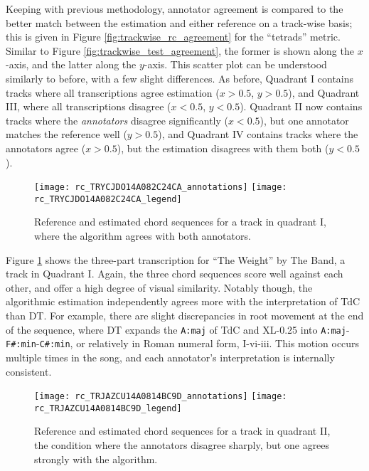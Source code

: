 Keeping with previous methodology, annotator agreement is compared to the better match between the estimation and either reference on a track-wise basis; this is given in Figure \ref{fig:trackwise_rc_agreement} for the ``tetrads'' metric.
Similar to Figure \ref{fig:trackwise_test_agreement}, the former is shown along the $x$-axis, and the latter along the $y$-axis.
This scatter plot can be understood similarly to before, with a few slight differences.
As before, Quadrant I contains tracks where all transcriptions agree estimation ($x > 0.5$, $y > 0.5$), and Quadrant III, where all transcriptions disagree ($x < 0.5$, $y < 0.5$).
Quadrant II now contains tracks where the \emph{annotators} disagree significantly ($x < 0.5$), but one annotator matches the reference well ($y > 0.5$), and Quadrant IV contains tracks where the annotators agree ($x > 0.5$), but the estimation disagrees with them both ($y < 0.5$).


\begin{figure}[t!]
\centering
\texttt{[image: rc\_TRYCJDO14A082C24CA\_annotations]}
\texttt{[image: rc\_TRYCJDO14A082C24CA\_legend]}
\caption{Reference and estimated chord sequences for a track in quadrant I, where the algorithm agrees with both annotators.}
\label{fig:rc_quadI}
\end{figure}

Figure \ref{fig:rc_quadI} shows the three-part transcription for ``The Weight'' by The Band, a track in Quadrant I.
Again, the three chord sequences score well against each other, and offer a high degree of visual similarity.
Notably though, the algorithmic estimation independently agrees more with the interpretation of TdC than DT.
For example, there are slight discrepancies in root movement at the end of the sequence, where DT expands the \texttt{A:maj} of TdC and XL-0.25 into \texttt{A:maj}-\texttt{F\#:min}-\texttt{C\#:min}, or relatively in Roman numeral form, I-vi-iii.
This motion occurs multiple times in the song, and each annotator's interpretation is internally consistent.

\begin{figure}[t!]
\centering
\texttt{[image: rc\_TRJAZCU14A0814BC9D\_annotations]}
\texttt{[image: rc\_TRJAZCU14A0814BC9D\_legend]}
\caption{Reference and estimated chord sequences for a track in quadrant II, the condition where the annotators disagree sharply, but one agrees strongly with the algorithm.}
\label{fig:rc_quadII}
\end{figure}

